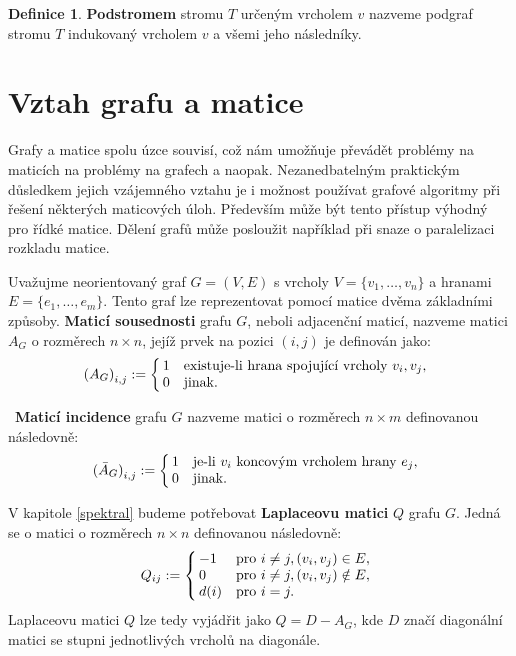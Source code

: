 \documentclass{ctuthesis}
\theoremstyle{plain}
\theoremstyle{definition}
\newtheorem{definition}{Definice}
\begin{document}
\begin{definition}
  \textbf{Podstromem} stromu $T$ určeným vrcholem $v$ nazveme podgraf stromu $T$ indukovaný vrcholem $v$ a všemi jeho následníky.
\end{definition}

\section{Vztah grafu a matice}
\label{GrMatRel}
Grafy a matice spolu úzce souvisí, což nám umožňuje převádět problémy na maticích na problémy na grafech a naopak. Nezanedbatelným praktickým důsledkem jejich vzájemného vztahu je i možnost používat grafové algoritmy při řešení některých maticových úloh. Především může být tento přístup výhodný pro řídké matice. Dělení grafů může posloužit například při snaze o paralelizaci rozkladu matice.

Uvažujme neorientovaný graf $G=(V,E)$ s vrcholy $V = \{v_1, \ldots, v_n\}$ a hranami $E = \{e_1, \ldots, e_m\}$. Tento graf lze reprezentovat pomocí matice dvěma základními způsoby. \textbf{Maticí sousednosti} grafu $G$, neboli adjacenční maticí, nazveme matici $A_G$ o rozměrech $n \times n$, jejíž prvek na pozici $(i,j)$ je definován jako:
\[
  {(A_G)}_{i,j} :=
  \left\{
    \begin{array}{@{\,}ll}
      1  & \mbox{existuje-li hrana spojující vrcholy $v_i, v_j$,} \\
      0  & \mbox{jinak.}
    \end{array}
  \right.
\]

 \textbf{Maticí incidence} grafu $G$ nazveme matici o rozměrech $n \times m$  definovanou následovně:
\[
  {(\bar{A}_G)}_{i,j} :=
  \left\{
	  \begin{array}{@{\,}ll}
		  1  & \mbox{je-li $v_i$ koncovým vrcholem hrany $e_j$,} \\
		  0  & \mbox{jinak.}
	  \end{array}
  \right.
\]

V kapitole \ref{spektral} budeme potřebovat \textbf{Laplaceovu matici} $Q$ grafu $G$. Jedná se o matici o rozměrech $n \times n$ definovanou následovně:
\[
Q_{ij} :=
\left\{
	\begin{array}{@{\,}ll}
		-1  & \mbox{pro } i \neq j, (v_i,v_j) \in E, \\
		0 & \mbox{pro } i \neq j, (v_i,v_j) \notin E,\\
        d(i) & \mbox{pro } i = j.
	\end{array}
\right.
\]
Laplaceovu matici $Q$ lze tedy vyjádřit jako $Q = D - A_G$, kde $D$  značí diagonální matici se stupni jednotlivých vrcholů na diagonále.
\end{document}
